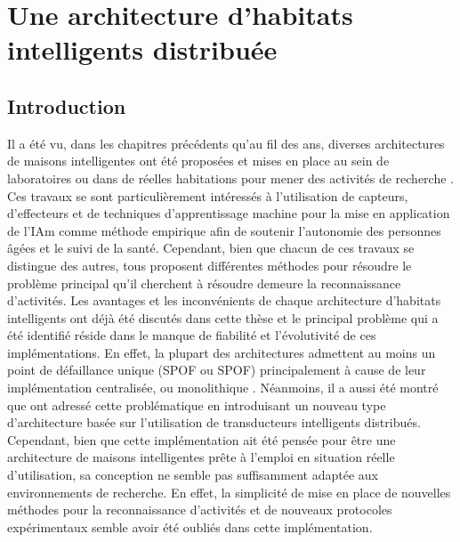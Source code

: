 \chapter{Une architecture d'habitats intelligents distribuée}
\label{chap:5}

\section{Introduction}

Il a été vu, dans les chapitres précédents qu'au fil des ans, diverses architectures de maisons intelligentes ont été proposées et mises en place au sein de laboratoires ou dans de réelles habitations pour mener des activités de recherche \citep{DJCook2003,Helal2005,Giroux2009,Cook2013,Bouchard2014,Lago2017,Plantevin2018}. Ces travaux se sont particulièrement intéressés à l'utilisation de capteurs, d'effecteurs et de techniques d'apprentissage machine pour la mise en application de l'\acl{IAm} comme méthode empirique afin de soutenir l'autonomie des personnes âgées et le suivi de la santé. Cependant, bien que chacun de ces travaux se distingue des autres, tous proposent différentes méthodes pour résoudre le problème principal qu'il cherchent à résoudre demeure la reconnaissance d'activités. Les avantages et les inconvénients de chaque architecture d'habitats intelligents ont déjà été discutés dans cette thèse et le principal problème qui a été identifié réside dans le manque de fiabilité et l'évolutivité de ces implémentations. En effet, la plupart des architectures admettent au moins un point de défaillance unique (\acl{SPOF} ou \acs{SPOF}) principalement à cause de leur implémentation centralisée, ou \og monolithique \fg. Néanmoins, il a aussi été montré que \cite{Plantevin2018} ont adressé cette problématique en introduisant un nouveau type d'architecture basée sur l'utilisation de transducteurs intelligents distribués. Cependant, bien que cette implémentation ait été pensée pour être une architecture de maisons intelligentes prête à l'emploi en situation réelle d'utilisation, sa conception ne semble pas suffisamment adaptée aux environnements de recherche. En effet, la simplicité de mise en place de nouvelles méthodes pour la reconnaissance d'activités et de nouveaux protocoles expérimentaux semble avoir été oubliés dans cette implémentation.

